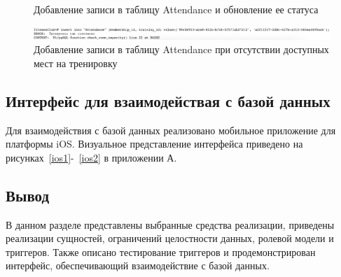 \newpage
\begin{figure}[ht!]
	\begin{center}
	\end{center}
	\caption{Добавление записи в таблицу Attendance и обновление ее статуса}
	\label{fig:t3}
\end{figure}

\newpage
\begin{figure}[ht!]
	\begin{center}
		\includegraphics[scale=0.58]{./img/test4.png}
	\end{center}
	\caption{Добавление записи в таблицу Attendance при отсутствии доступных мест на тренировку}
	\label{fig:t4}
\end{figure}

\subsection{Интерфейс для взаимодействая с базой данных}

Для взаимодействия с базой данных реализовано мобильное приложение для платформы iOS. Визуальное представление интерфейса приведено на рисунках~\ref{ios1}-~\ref{ios2} в приложении А. 

\subsection*{Вывод}

В данном разделе представлены выбранные средства реализации, приведены реализации сущностей, ограничений целостности данных, ролевой модели и триггеров. Также описано тестирование триггеров и продемонстрирован интерфейс, обеспечивающий взаимодействие с базой данных.